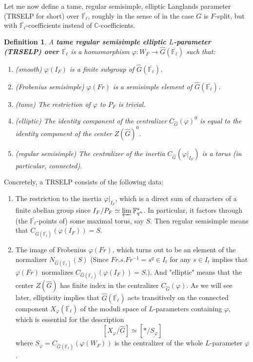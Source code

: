 \documentclass{article}
\newtheorem{definition}{Definition}
\begin{document}
	Let me now define a tame, regular semisimple, elliptic Langlands parameter (TRSELP for short) over $\overline{\mathbb{F}_{\ell}}$, roughly in the sense of \cite[Section 3.4 and Section 4.1]{debacker2009depth} in the case $G$ is $F$-split, but with $\overline{\mathbb{F}_{\ell}}$-coefficients instead of $\mathbb{C}$-coefficients.
	
	\begin{definition}
		A \textbf{tame regular semisimple elliptic $L$-parameter (TRSELP) over $\overline{\mathbb{F}_{\ell}}$} is a homomorphism $\varphi: W_F \to \hat{G}(\overline{\mathbb{F}_{\ell}})$ such that:
		\begin{enumerate}
			\item (smooth) $\varphi(I_F)$ is a finite subgroup of $\hat{G}(\overline{\mathbb{F}_{\ell}})$.
			\item (Frobenius semisimple) $\varphi(Fr)$ is a semisimple element of $\hat{G}(\overline{\mathbb{F}_{\ell}})$.
			\item (tame) The restriction of $\varphi$ to $P_F$ is trivial.
			\item \label{elliptic} (elliptic) The identity component of the centralizer $C_{\hat{G}}(\varphi)^0$ is equal to the identity component of the center $Z(\hat{G})^0$.
			\item \label{regular semisimple}(regular semisimple) The centralizer of the inertia $C_{\hat{G}}(\varphi|_{I_F})$ is a torus (in particular, connected).
		\end{enumerate}
	\end{definition}

    Concretely, a TRSELP consists of the following data:
    
    \begin{enumerate}
    	\item The restriction to the inertia $\varphi|_{I_F}$, which is a direct sum of characters of a finite abelian group since $I_F/P_F \simeq \varprojlim\mathbb{F}_{q^n}^*$. In particular, it factors through (the $\overline{\mathbb{F}_{\ell}}$-points of) some maximal torus, say $S$. Then regular semisimple means that $C_{\hat{G}(\overline{\mathbb{F}_{\ell}})}(\varphi(I_F))=S$.
    	\item The image of Frobenius $\varphi(Fr)$, which turns out to be an element of the normalizer $N_{\hat{G}(\overline{\mathbb{F}_{\ell}})}(S)$ (Since $Fr.s.Fr^{-1}=s^q \in I_t$ for any $s \in I_t$ implies that $\varphi(Fr)$ normalizes $C_{\hat{G}(\overline{\mathbb{F}_{\ell}})}(\varphi(I_F))=S$.). 
        And "elliptic" means that the center $Z(\hat{G})$ has finite index in the centralizer $C_{\hat{G}}(\varphi)$. As we will see later, ellipticity implies that $\hat{G}(\overline{\mathbb{F}_{\ell}})$ acts transitively on the connected component $X_{\varphi}(\overline{\mathbb{F}_{\ell}})$ of the moduli space of $L$-parameters containing $\varphi$, which is essential for the description
    	$$[X_{\varphi}/\hat{G}] \simeq [*/\underline{S_{\varphi}}]$$
    	where $S_\varphi=C_{\hat{G}(\overline{\mathbb{F}_{\ell}})}(\varphi(W_F))$ is the centralizer of the whole $L$-parameter $\varphi$.
    \end{enumerate}
\end{document}
